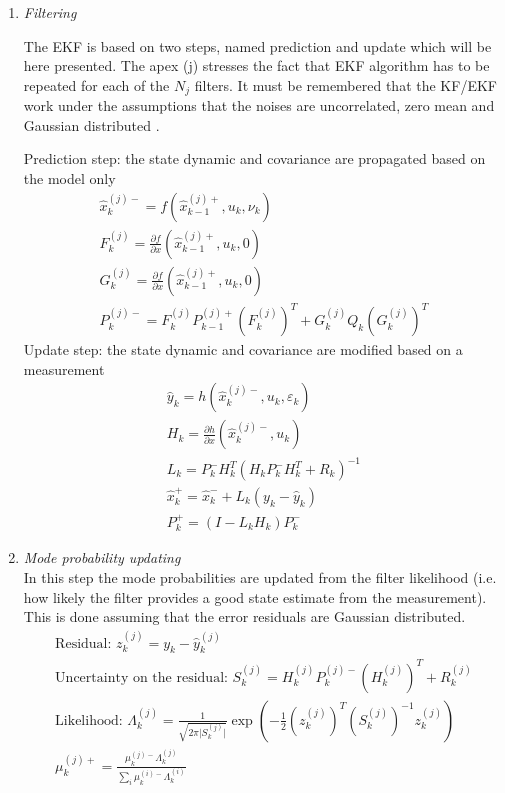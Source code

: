 \begin{enumerate}
\item \textit{Filtering}

The EKF is based on two steps, named prediction and update which will be here presented. The apex (j) stresses the fact that EKF algorithm has to be repeated for each of the $N_j$ filters. It must be remembered that the KF/EKF work under the assumptions that the noises are uncorrelated, zero mean and Gaussian distributed \cite{Kalman_Filter_and_Its_Application}. 

Prediction step: the state dynamic and covariance are propagated based on the model only 
\begin{gather}
  \hat{x}_k^{(j)-} = f(\hat{x}_{k-1}^{(j)+}, u_k, \nu_k)\\
  F_k^{(j)} = \frac{\partial f}{\partial x}(\hat{x}_{k-1}^{(j)+}, u_k, 0)\\
  G_k^{(j)} = \frac{\partial f}{\partial x}(\hat{x}_{k-1}^{(j)+}, u_k, 0)\\
  P_k^{(j)-} = F_k^{(j)} P_{k-1}^{(j)+} \left(F_k^{(j)}\right)^T + G_k^{(j)} Q_k \left(G_k^{(j)}\right)^T
\end{gather}
Update step: the state dynamic and covariance are modified based on a measurement 
\begin{gather}
  \hat{y}_k = h(\hat{x}_k^{(j)-}, u_k, \varepsilon_k)\\
  H_k = \frac{\partial h}{\partial x}(\hat{x}_k^{(j)-}, u_k)\\
  L_k = P_k^- H_k^T (H_k P_k^- H_k^T + R_k)^{-1}\\
  \hat{x}_k^+ = \hat{x}_k^- + L_k (y_k - \hat{y}_k)\\
  P_k^+ = (I - L_k H_k) P_k^-
\end{gather}

\item \textit{Mode probability updating}\\
In this step the mode probabilities are updated from the filter likelihood (i.e. how likely the filter provides a good state estimate from the measurement). This is done assuming that the error residuals are Gaussian distributed.  
\begin{gather}
  \text{Residual: } z_k^{(j)} = y_k - \hat{y}_k^{(j)}\\
  \text{Uncertainty on the residual: }S_k^{(j)} = H_k^{(j)} P_k^{(j)-} (H_k^{(j)})^T + R_k^{(j)}\\
  \text{Likelihood: } \Lambda_k^{(j)} = \frac{1}{\sqrt{2 \pi \lvert S_k^{(j)} \rvert}} \exp{\left(-\frac{1}{2}\left(z_k^{(j)}\right)^T \left(S_k^{(j)}\right)^{-1} z_k^{(j)}\right)}\\
  \mu_k^{(j)+} = \frac{\mu_k^{(j)-}\Lambda_k^{(j)}}{\sum_{i} \mu_k^{(i)-}\Lambda_k^{(i)}}
\end{gather}


\end{enumerate}
